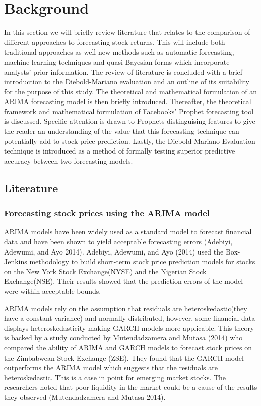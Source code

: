 \documentclass[12pt,a4paper]{article}
\numberwithin{equation}{section}
\numberwithin{figure}{section}
\numberwithin{table}{section}
\begin{document}
\section{Background}\label{background}

In this section we will briefly review literature that relates to the
comparison of different approaches to forecasting stock returns. This
will include both traditional approaches as well new methods such as
automatic forecasting, machine learning techniques and quasi-Bayesian
forms which incorporate analysts' prior information. The review of
literature is concluded with a brief introduction to the Diebold-Mariano
evaluation and an outline of its suitability for the purpose of this
study. The theoretical and mathematical formulation of an ARIMA
forecasting model is then briefly introduced. Thereafter, the
theoretical framework and mathematical formulation of Facebooks' Prophet
forecasting tool is discussed. Specific attention is drawn to Prophets
distinguising features to give the reader an understanding of the value
that this forecasting technique can potentially add to stock price
prediction. Lastly, the Diebold-Mariano Evaluation technique is
introduced as a method of formally testing superior predictive accuracy
between two forecasting models.

\subsection{Literature}\label{literature}

\subsubsection{Forecasting stock prices using the ARIMA
model}\label{forecasting-stock-prices-using-the-arima-model}

ARIMA models have been widely used as a standard model to forecast
financial data and have been shown to yield acceptable forecasting
errors (Adebiyi, Adewumi, and Ayo 2014). Adebiyi, Adewumi, and Ayo
(2014) used the Box-Jenkins methodology to build short-term stock price
prediction models for stocks on the New York Stock Exchange(NYSE) and
the Nigerian Stock Exchange(NSE). Their results showed that the
prediction errors of the model were within acceptable bounds.

ARIMA models rely on the assumption that residuals are
heteroskedastic(they have a constant variance) and normally distributed,
however, some financial data displays heteroskedasticity making GARCH
models more applicable. This theory is backed by a study conducted by
Mutendadzamera and Mutasa (2014) who compared the ability of ARIMA and
GARCH models to forecast stock prices on the Zimbabwean Stock Exchange
(ZSE). They found that the GARCH model outperforms the ARIMA model which
suggests that the residuals are heteroskedastic. This is a case in point
for emerging market stocks. The researchers noted that poor liquidity in
the market could be a cause of the results they observed (Mutendadzamera
and Mutasa 2014).
\end{document}
